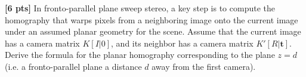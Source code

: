 \begin{questions}
    \begin{tcolorbox}[fit,height fill, width=\textwidth, blank, borderline={0.5pt}{-2pt},halign=left, valign=center, nobeforeafter]


    \end{tcolorbox}
    
    \clearpage
        \question \textbf{[6 pts]} In fronto-parallel plane sweep stereo, a key step is to compute the homography that warps pixels from a neighboring image onto the current image under an assumed planar geometry for the scene. Assume that the current image has a camera matrix $K[I | 0]$, and its neighbor has a camera matrix $K' [R | \mathbf{t}]$. Derive the formula for the planar homography corresponding to the plane $z = d$ (i.e. a fronto-parallel plane a distance $d$ away from the first camera).

    \begin{tcolorbox}[fit,height fill, width=\textwidth, blank, borderline={0.5pt}{-2pt},halign=left, valign=center, nobeforeafter]
    
        \end{tcolorbox}

\end{questions}